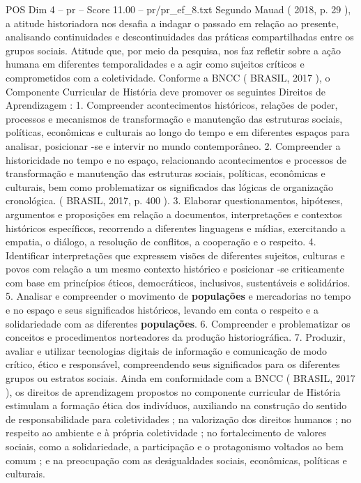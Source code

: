 \begin{textsample}{POS Dim 4 – pr – Score 11.00 – pr/pr\_ef\_8.txt}
Segundo Mauad ( 2018, p. 29 ), a atitude historiadora nos desafia a indagar o passado em relação ao presente, analisando continuidades e descontinuidades das práticas compartilhadas entre os grupos sociais.
Atitude que, por meio da pesquisa, nos faz refletir sobre a ação humana em diferentes temporalidades e a agir como sujeitos críticos e comprometidos com a coletividade.
Conforme a BNCC ( BRASIL, 2017 ), o Componente Curricular de História deve promover os seguintes Direitos de Aprendizagem : 1.
Compreender acontecimentos históricos, relações de poder, processos e mecanismos de transformação e manutenção das estruturas sociais, políticas, econômicas e culturais ao longo do tempo e em diferentes espaços para analisar, posicionar -se e intervir no mundo contemporâneo. 2.
Compreender a historicidade no tempo e no espaço, relacionando acontecimentos e processos de transformação e manutenção das estruturas sociais, políticas, econômicas e culturais, bem como problematizar os significados das lógicas de organização cronológica. ( BRASIL, 2017, p. 400 ). 3.
Elaborar questionamentos, hipóteses, argumentos e proposições em relação a documentos, interpretações e contextos históricos específicos, recorrendo a diferentes linguagens e mídias, exercitando a empatia, o diálogo, a resolução de conflitos, a cooperação e o respeito. 4.
Identificar interpretações que expressem visões de diferentes sujeitos, culturas e povos com relação a um mesmo contexto histórico e posicionar -se criticamente com base em princípios éticos, democráticos, inclusivos, sustentáveis e solidários. 5.
Analisar e compreender o movimento de \textbf{populações} e mercadorias no tempo e no espaço e seus significados históricos, levando em conta o respeito e a solidariedade com as diferentes \textbf{populações}. 6.
Compreender e problematizar os conceitos e procedimentos norteadores da produção historiográfica. 7.
Produzir, avaliar e utilizar tecnologias digitais de informação e comunicação de modo crítico, ético e responsável, compreendendo seus significados para os diferentes grupos ou estratos sociais.
Ainda em conformidade com a BNCC ( BRASIL, 2017 ), os direitos de aprendizagem propostos no componente curricular de História estimulam a formação ética dos indivíduos, auxiliando na construção do sentido de responsabilidade para coletividades ; na valorização dos direitos humanos ; no respeito ao ambiente e à própria coletividade ; no fortalecimento de valores sociais, como a solidariedade, a participação e o protagonismo voltados ao bem comum ; e na preocupação com as desigualdades sociais, econômicas, políticas e culturais.

\end{textsample}
